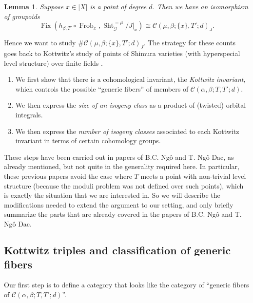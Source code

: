 \documentclass[reqno]{amsart}
\numberwithin{equation}{section}
\newcommand{\Cal}[1]{\mathcal{#1}}
\DeclareMathOperator{\Frob}{Frob}
\DeclareMathOperator{\Fix}{Fix}
\DeclareMathOperator{\Sht}{Sht}
\newtheorem{lemma}[thm]{Lemma}
\theoremstyle{remark}
\numberwithin{equation}{section}
\begin{document}
\begin{lemma}\label{lem: equivalence of groupoids}
Suppose $x \in |X|$ is a point of degree $d$. Then we have an isomorphism of groupoids 
\[
\Fix(h_{\beta,T'} \circ \Frob_{x}, \Sht_{\Cal{G}}^{= \mu}/J|_x) \cong \Cal{C}(\mu, \beta; \{x\}, T';d)_J.
\]
\end{lemma}

Hence we want to study $\# \Cal{C}(\mu, \beta; \{x\}, T';d)_J$. The strategy for these counts goes back to Kottwitz's study of points of Shimura varieties (with hyperspecial level structure) over finite fields \cite{Kott92}. 
\begin{enumerate}
\item We first show that there is a cohomological invariant, the \emph{Kottwitz invariant}, which controls the possible ``generic fibers'' of members of $\Cal{C}(\alpha,\beta; T,T'; d)$. 
\item We then express the \emph{size of an isogeny class} as a product of (twisted) orbital integrals. 
\item We then express the \emph{number of isogeny classes} associated to each Kottwitz invariant in terms of certain cohomology groups. 
\end{enumerate}
These steps have been carried out in papers of B.C. Ng\^{o} and T. Ng\^{o} Dac, as already mentioned, but not quite in the generality required here. In particular, these previous papers avoid the case where $T$ meets a point with non-trivial level structure (because the moduli problem was not defined over such points), which is exactly the situation that we are interested in. So we will describe the modifications needed to extend the argument to our setting, and only briefly summarize the parts that are already covered in the papers of B.C. Ng\^{o} and T. Ng\^{o} Dac.


\subsection{Kottwitz triples and classification of generic fibers}

Our first step is to define a category that looks like the category of ``generic fibers of $\Cal{C}(\alpha,\beta; T,T'; d)$''. 
\end{document}
